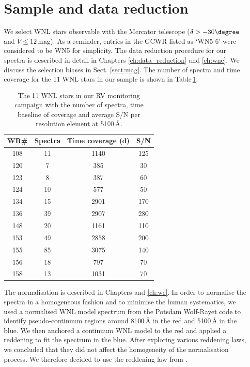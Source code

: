 \section{Sample and data reduction} \label{sect:sample_WNL}

We select WNL stars observable with the Mercator telescope ($\delta>-30\degree$ and $V\le12$\,mag). As a reminder, entries in the GCWR listed as `WN5-6' were considered to be WN5 for simplicity. The data reduction procedure for our spectra is described in detail in Chapters \ref{ch:data_reduction} and \ref{ch:wne}. We discuss the selection biases in Sect. \ref{sect:mag}. The number of spectra and time coverage for the 11 WNL stars in our sample is shown in Table\,\ref{tab:time_coverage_spec}.

\begin{table}[]
    \centering
    \caption{The 11 WNL stars in our RV monitoring campaign with the number of spectra, time baseline of coverage and average S/N per resolution element at 5100\,\r{A}.}
    \begin{tabular}{cccc}
    \hline \hline
    WR\#&Spectra&Time coverage (d)&S/N\\ \hline
    108&11&1140&125\\
    120&7&385&30\\
    123&8&387&60\\
    124&10&577&50\\
    134&15&2901&170\\
    136&39&2907&280\\
    148&20&1161&110\\
    153&49&2858&200\\
    155&85&3075&140\\
    156&18&797&70\\
    158&13&1031&70\\
    \hline
    \end{tabular}
    \label{tab:time_coverage_spec}
\end{table}

The normalisation is described in Chapters and \ref{ch:wc}. In order to normalise the spectra in a homogeneous fashion and to minimise the human systematics, we used a normalised WNL model spectrum from the Potsdam Wolf-Rayet code \citep{grafener_line-blanketed_2002,todt_potsdam_2015} to identify pseudo-continuum regions around 8100\,\r{A} in the red and 5100\,\r{A} in the blue. We then anchored a continuum WNL model to the red and applied a reddening to fit the spectrum in the blue. After exploring various reddening laws, we concluded that they did not affect the homogeneity of the normalisation process. We therefore decided to use the reddening law from \citet{fitzpatrick_interstellar_2004}.

